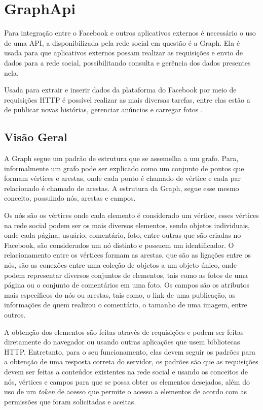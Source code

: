 \chapter[GraphApi]{GraphApi}
Para integração entre o Facebook e outros aplicativos externos é necessário o uso de uma API, a disponibilizada pela rede social em questão é a Graph. Ela é usada para que aplicativos externos possam realizar as requisições e envio de dados para a rede social, possibilitando consulta e gerência dos dados presentes nela. 

Usada para extrair e inserir dados da plataforma do Facebook por meio de requisições HTTP é possível realizar as mais diversas tarefas, entre elas estão a de publicar novas histórias, gerenciar anúncios e carregar fotos \cite{facebook2018b}.

\section{Visão Geral}
A Graph segue um padrão de estrutura que se assemelha a um grafo. Para\cite{soares2014}, informalmente um grafo pode ser explicado como um conjunto de pontos que formam vértices e arestas, onde cada ponto é chamado de vértice e cada par relacionado é chamado de arestas. A estrutura da Graph, segue esse mesmo conceito, possuindo nós, arestas e campos. 

Os nós são os vértices onde cada elemento é considerado um vértice, esses vértices na rede social podem ser os mais diversos elementos, sendo objetos individuais, onde cada página, usuário, comentário, foto, entre outras que são criadas no Facebook, são considerados um nó distinto \cite{facebook2018b} e possuem um identificador. O relacionamento entre os vértices formam as arestas, que são as ligações entre os nós, são as conexões entre uma coleção de objetos a um objeto único, onde podem representar diversos conjuntos de elementos, tais como as fotos de uma página ou o conjunto de comentários em uma foto. Os campos são os atributos mais específicos do nós ou arestas, tais como, o link de uma publicação, as informações de quem realizou o comentário, o tamanho de uma imagem, entre outros.

A obtenção dos elementos são feitas através de requisições e podem ser feitas diretamente do navegador ou usando outras aplicações que usem bibliotecas HTTP. Entretanto, para o seu funcionamento, elas devem seguir os padrões para a obtenção de uma resposta correta do servidor, os padrões são que as requisições devem ser feitas a conteúdos existentes na rede social e usando os conceitos de nós, vértices e campos para que se possa obter os elementos desejados, além do uso de um \textit{token} de acesso que permite o acesso a elementos de acordo com as permissões que foram solicitadas e aceitas.

